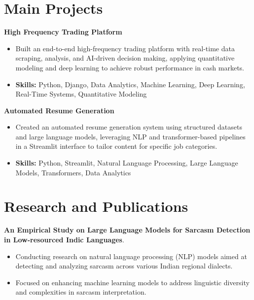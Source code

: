 \documentclass[a4paper,11pt]{article}
\begin{document}
\section{\textbf{Main Projects}}

\vspace{1mm}
  \textbf{High Frequency Trading Platform  }
\vspace{-1.5mm} %
\begin{itemize}
  \item Built an end-to-end high-frequency trading platform with real-time data scraping, analysis, and AI-driven decision making, applying quantitative modeling and deep learning to achieve robust performance in cash markets.
\vspace{-3mm}
  \item \textbf{Skills:} Python, Django, Data Analytics, Machine Learning, Deep Learning, Real-Time Systems, Quantitative Modeling
\end{itemize}


\vspace{1mm}
   \textbf{Automated Resume Generation }
\vspace{-1.5mm} %
\begin{itemize}
  \item Created an automated resume generation system using structured datasets and large language models, leveraging NLP and transformer-based pipelines in a Streamlit interface to tailor content for specific job categories.
\vspace{-3mm}
  \item \textbf{Skills:} Python, Streamlit, Natural Language Processing, Large Language Models, Transformers, Data Analytics
\end{itemize}



\section{\textbf{Research and Publications} \hfill }
\vspace{1mm}
  \textbf{An Empirical Study on Large Language Models for Sarcasm Detection in Low-resourced Indic Languages}.
\vspace{-1mm} %
\begin{itemize}
  \item Conducting research on natural language processing (NLP) models aimed at detecting and analyzing sarcasm across various Indian regional dialects.
\vspace{-3mm}
  \item Focused on enhancing machine learning models to address linguistic diversity and complexities in sarcasm interpretation.
\end{itemize}
\end{document}
